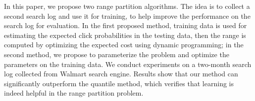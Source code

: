 In this paper, we propose two range partition algorithms. The idea is to collect a second search log and use it for training, to help improve the performance on the search log for evaluation. In the first proposed method, training data is used for estimating the expected click probabilities in the testing data, then the range is computed by optimizing the expected cost using dynamic programming; in the second method, we propose to parameterize the problem and optimize the parameters on the training data. We conduct experiments on a two-month search log collected from Walmart search engine. Results show that our method can significantly outperform the quantile method, which verifies that learning is indeed helpful in the range partition problem.




